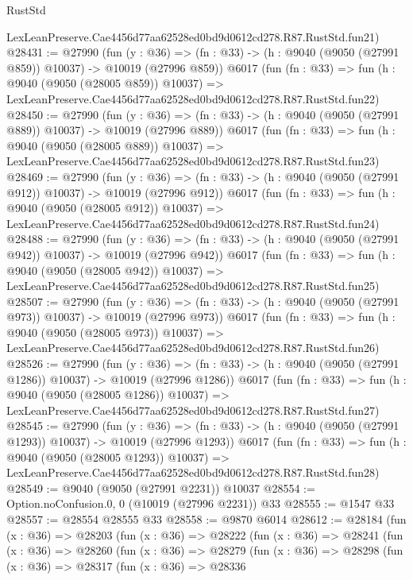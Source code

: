 \begin{lexlean}{RustStd}
\begin{coremodule}
{{    LexLeanPreserve.Cae4456d77aa62528ed0bd9d0612cd278.R87.RustStd.fun21)
@28431 := @27990
    (fun (y : @36) =>
    (fn : @33) -> (h : @9040 (@9050 (@27991 @859)) @10037) -> @10019 (@27996 @859))
    @6017
    (fun (fn : @33) =>
    fun (h : @9040 (@9050 (@28005 @859)) @10037) =>
    LexLeanPreserve.Cae4456d77aa62528ed0bd9d0612cd278.R87.RustStd.fun22)
@28450 := @27990
    (fun (y : @36) =>
    (fn : @33) -> (h : @9040 (@9050 (@27991 @889)) @10037) -> @10019 (@27996 @889))
    @6017
    (fun (fn : @33) =>
    fun (h : @9040 (@9050 (@28005 @889)) @10037) =>
    LexLeanPreserve.Cae4456d77aa62528ed0bd9d0612cd278.R87.RustStd.fun23)
@28469 := @27990
    (fun (y : @36) =>
    (fn : @33) -> (h : @9040 (@9050 (@27991 @912)) @10037) -> @10019 (@27996 @912))
    @6017
    (fun (fn : @33) =>
    fun (h : @9040 (@9050 (@28005 @912)) @10037) =>
    LexLeanPreserve.Cae4456d77aa62528ed0bd9d0612cd278.R87.RustStd.fun24)
@28488 := @27990
    (fun (y : @36) =>
    (fn : @33) -> (h : @9040 (@9050 (@27991 @942)) @10037) -> @10019 (@27996 @942))
    @6017
    (fun (fn : @33) =>
    fun (h : @9040 (@9050 (@28005 @942)) @10037) =>
    LexLeanPreserve.Cae4456d77aa62528ed0bd9d0612cd278.R87.RustStd.fun25)
@28507 := @27990
    (fun (y : @36) =>
    (fn : @33) -> (h : @9040 (@9050 (@27991 @973)) @10037) -> @10019 (@27996 @973))
    @6017
    (fun (fn : @33) =>
    fun (h : @9040 (@9050 (@28005 @973)) @10037) =>
    LexLeanPreserve.Cae4456d77aa62528ed0bd9d0612cd278.R87.RustStd.fun26)
@28526 := @27990
    (fun (y : @36) =>
    (fn : @33) -> (h : @9040 (@9050 (@27991 @1286)) @10037) -> @10019 (@27996 @1286))
    @6017
    (fun (fn : @33) =>
    fun (h : @9040 (@9050 (@28005 @1286)) @10037) =>
    LexLeanPreserve.Cae4456d77aa62528ed0bd9d0612cd278.R87.RustStd.fun27)
@28545 := @27990
    (fun (y : @36) =>
    (fn : @33) -> (h : @9040 (@9050 (@27991 @1293)) @10037) -> @10019 (@27996 @1293))
    @6017
    (fun (fn : @33) =>
    fun (h : @9040 (@9050 (@28005 @1293)) @10037) =>
    LexLeanPreserve.Cae4456d77aa62528ed0bd9d0612cd278.R87.RustStd.fun28)
@28549 := @9040 (@9050 (@27991 @2231)) @10037
@28554 := Option.noConfusion.{0, 0} (@10019 (@27996 @2231)) @33
@28555 := @1547 @33
@28557 := @28554 @28555 @33
@28558 := @9870 @6014
@28612 := @28184
    (fun (x : @36) =>
    @28203
      (fun (x : @36) =>
      @28222
        (fun (x : @36) =>
        @28241
          (fun (x : @36) =>
          @28260
            (fun (x : @36) =>
            @28279
              (fun (x : @36) =>
              @28298
                (fun (x : @36) =>
                @28317
                  (fun (x : @36) =>
                  @28336
}}
\end{coremodule}
\end{lexlean}
